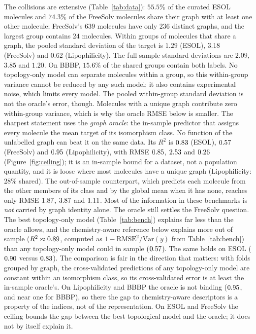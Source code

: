 \documentclass[11pt,a4paper]{article}
\theoremstyle{definition}
\begin{document}
The collisions are extensive (Table~\ref{tab:data}): $55.5\%$ of the
curated ESOL molecules and $74.3\%$ of the FreeSolv molecules share their
graph with at least one other molecule; FreeSolv's $639$ molecules have
only $236$ distinct graphs, and the largest group contains $24$
molecules. Within groups of molecules that share a graph, the pooled
standard deviation of the target is $1.29$ (ESOL), $3.18$ (FreeSolv)
and $0.62$ (Lipophilicity). The full-sample standard deviations are
$2.09$, $3.85$ and $1.20$. On BBBP, $15.6\%$ of the shared groups
contain both labels. No topology-only model can separate molecules
within a group, so this within-group variance cannot be reduced by
any such model; it also contains experimental noise, which limits
every model. The pooled within-group standard deviation is not the
oracle's error, though. Molecules with a unique graph contribute zero
within-group variance, which is why the oracle RMSE below is smaller.
The sharpest statement uses the \emph{graph oracle}: the
in-sample predictor that assigns every molecule the mean target of its
isomorphism class. No function of the unlabelled graph can beat it on
the same data. Its $R^2$ is $0.83$ (ESOL), $0.57$
(FreeSolv) and $0.95$ (Lipophilicity), with RMSE
$0.85$, $2.53$ and $0.26$
(Figure~\ref{fig:ceiling}); it is an in-sample bound for a dataset,
not a population quantity, and it is loose where most molecules have a
unique graph (Lipophilicity: $28\%$ shared). The out-of-sample
counterpart, which predicts each molecule from the other members of
its class and by the global mean when it has none, reaches only RMSE
$1.87$, $3.87$ and $1.11$. Most of the
information in these benchmarks is \emph{not} carried by graph
identity alone. The oracle still settles the FreeSolv question. The
best topology-only model (Table~\ref{tab:bench}) explains far less
than the oracle allows, and the chemistry-aware reference below
explains more out of sample ($R^2\approx0.89$, computed as
$1-\mathrm{RMSE}^2/\mathrm{Var}(y)$ from Table~\ref{tab:bench}) than
any topology-only model could in sample ($0.57$). The same
holds on ESOL ($0.90$ versus $0.83$). The
comparison is fair in the direction that matters: with folds grouped
by graph, the cross-validated predictions of any topology-only model
are constant within an isomorphism class, so its cross-validated error
is at least the in-sample oracle's. On Lipophilicity and BBBP the
oracle is not binding ($0.95$, and near one for BBBP), so
there the gap to chemistry-aware descriptors is a property of the
indices, not of the representation. On ESOL and FreeSolv the ceiling
bounds the gap between the best topological model and the oracle; it
does not by itself explain it.
\end{document}
